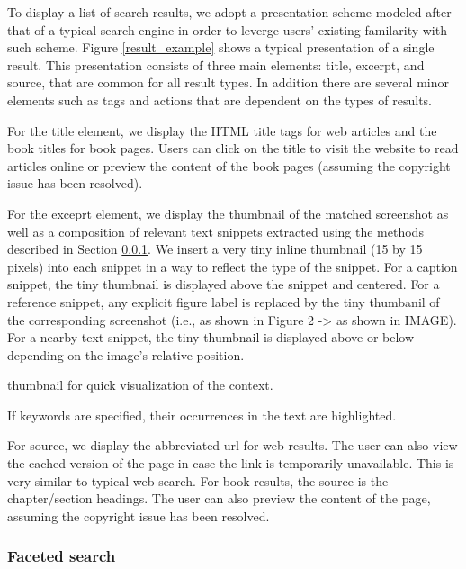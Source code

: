 \documentclass{www2010-submission}
\begin{document}

To display a list of search results, we adopt a presentation scheme 
modeled after that of a typical search engine in order to 
leverge users' existing familarity with such scheme.  Figure
\ref{result_example} shows a typical presentation of a single
result. This presentation consists of three main elements: title,
excerpt, and source, that are common for all result types. In addition
there are several minor elements such as tags and actions that
are dependent on the types of results.

For the title element, we display the HTML title tags for web articles
and the book titles for book pages. Users can click on the title to
visit the website to read articles online or preview the content of
the book pages (assuming the copyright issue has been resolved).

For the exceprt element, we display the thumbnail of the matched
screenshot as well as a composition of relevant text snippets
extracted using the methods described in Section \ref{}. We insert a
very tiny inline thumbnail (15 by 15 pixels) into each snippet in a
way to reflect the type of the snippet. For a caption snippet, the
tiny thumbnail is displayed above the snippet and centered.  For a
reference snippet, any explicit figure label is replaced by the tiny
thumbanil of the corresponding screenshot (i.e., as shown in Figure 2
-> as shown in IMAGE). For a nearby text snippet, the tiny thumbnail
is displayed above or below depending on the image's relative
position.


thumbnail for quick visualization of the context. 

If keywords are
specified, their occurrences in the text are highlighted.

For source, we display the abbreviated url for web results. The
user can also view the cached version of the page in case the link
is temporarily unavailable. This is very similar to typical web
search. For book results, the source is the chapter/section
headings. The user can also preview the content of the page,
assuming the copyright issue has been resolved.

\subsubsection{Faceted search}
\end{document}
